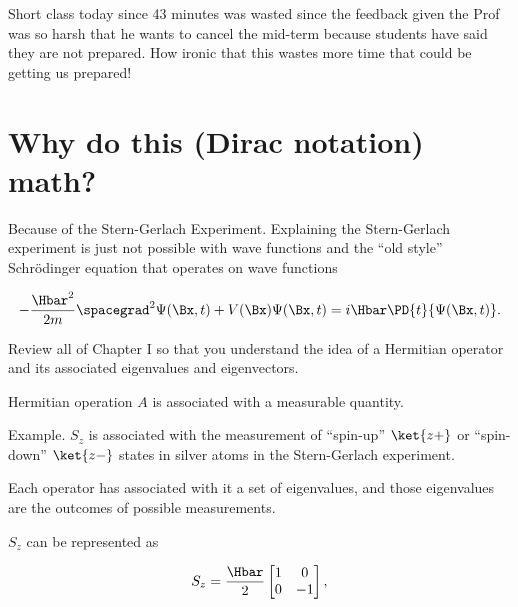 %
%

Short class today since 43 minutes was wasted since the feedback given the Prof was so harsh that he wants to cancel the mid-term because students have said they are not prepared.  How ironic that this wastes more time that could be getting us prepared!

\section{Why do this (Dirac notation) math?}

Because of the Stern-Gerlach Experiment.  Explaining the Stern-Gerlach experiment is just not possible with wave functions and the ``old style'' Schr\"{o}dinger equation that operates on wave functions

\begin{equation}\label{eqn:PHY356Foct26:100}
\begin{aligned}
- \frac{\Hbar^2}{2m} \spacegrad^2 \Psi(\Bx,t) + V(\Bx) \Psi(\Bx,t) = i \Hbar \PD{t}{\Psi(\Bx,t)}.
\end{aligned}
\end{equation}

Review all of Chapter I so that you understand the idea of a Hermitian operator and its associated eigenvalues and eigenvectors.

Hermitian operation \(A\) is associated with a measurable quantity.

Example.  \(S_z\) is associated with the measurement of ``spin-up'' \(\ket{z+}\) or ``spin-down'' \(\ket{z-}\) states in silver atoms in the Stern-Gerlach experiment.

Each operator has associated with it a set of eigenvalues, and those eigenvalues are the outcomes of possible measurements.

\(S_z\) can be represented as

\begin{equation}\label{eqn:PHY356Foct26:101}
\begin{aligned}
S_z = \frac{\Hbar}{2}
\begin{bmatrix}
1 & 0 \\
0 & -1
\end{bmatrix},
\end{aligned}
\end{equation}

